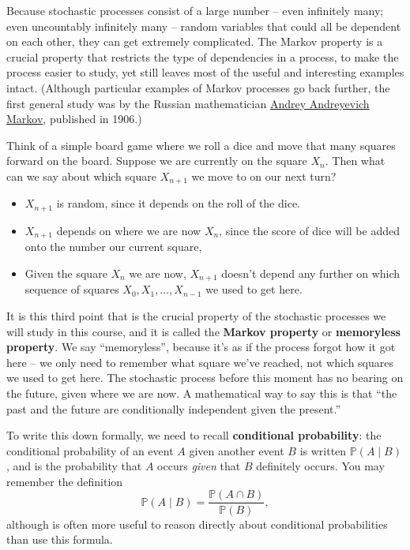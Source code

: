 \documentclass[
  a4paper,
]{article}
\providecommand{\tightlist}{%
  \setlength{\itemsep}{0pt}\setlength{\parskip}{0pt}}
\theoremstyle{definition}
\theoremstyle{definition}
\theoremstyle{definition}
\theoremstyle{remark}
\begin{document}
Because stochastic processes consist of a large number -- even infinitely many; even uncountably infinitely many -- random variables that could all be dependent on each other, they can get extremely complicated. The Markov property is a crucial property that restricts the type of dependencies in a process, to make the process easier to study, yet still leaves most of the useful and interesting examples intact. (Although particular examples of Markov processes go back further, the first general study was by the Russian mathematician \href{https://mathshistory.st-andrews.ac.uk/Biographies/Markov/}{Andrey Andreyevich Markov}, published in 1906.)

Think of a simple board game where we roll a dice and move that many squares forward on the board. Suppose we are currently on the square \(X_n\). Then what can we say about which square \(X_{n+1}\) we move to on our next turn?

\begin{itemize}
\tightlist
\item
  \(X_{n+1}\) is random, since it depends on the roll of the dice.
\item
  \(X_{n+1}\) depends on where we are now \(X_n\), since the score of dice will be added onto the number our current square,
\item
  Given the square \(X_n\) we are now, \(X_{n+1}\) doesn't depend any further on which sequence of squares \(X_0, X_1, \dots, X_{n-1}\) we used to get here.
\end{itemize}

It is this third point that is the crucial property of the stochastic processes we will study in this course, and it is called the \textbf{Markov property} or \textbf{memoryless property}. We say ``memoryless'', because it's as if the process forgot how it got here -- we only need to remember what square we've reached, not which squares we used to get here. The stochastic process before this moment has no bearing on the future, given where we are now. A mathematical way to say this is that ``the past and the future are conditionally independent given the present.''

To write this down formally, we need to recall \textbf{conditional probability}: the conditional probability of an event \(A\) given another event \(B\) is written \(\mathbb P(A \mid B)\), and is the probability that \(A\) occurs \emph{given} that \(B\) definitely occurs. You may remember the definition
\[ \mathbb P(A \mid B) = \frac{\mathbb P(A \cap B)}{\mathbb P(B)} , \]
although is often more useful to reason directly about conditional probabilities than use this formula.
\end{document}
